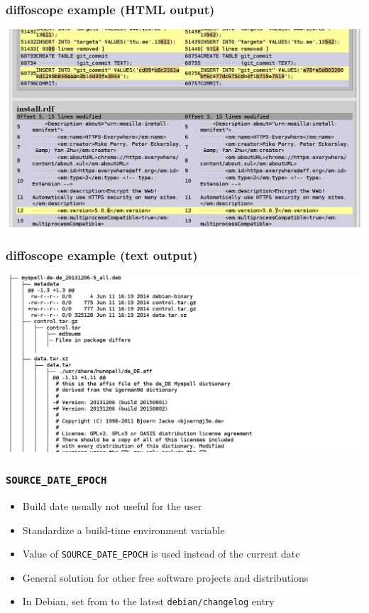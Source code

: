\documentclass[14pt]{beamer}
\begin{document}
\begin{frame}
 \frametitle{diffoscope example (HTML output)}

 \begin{center}
  \includegraphics[width=0.9\paperwidth]{images/diffoscope_example_html.png}
 \end{center}
\end{frame}

\begin{frame}
 \frametitle{diffoscope example (text output)}

 \begin{center}
  \includegraphics[width=0.9\paperwidth]{images/diffoscope_example_text.png}
 \end{center}
\end{frame}

\begin{frame}
 \frametitle{\texttt{SOURCE\_DATE\_EPOCH}}

 \begin{itemize}
  \item Build date usually not useful for the user
  \item Standardize a build-time environment variable
  \item Value of \texttt{SOURCE\_DATE\_EPOCH} is used instead of the current date
  \item General solution for other free software projects and distributions
  \item In Debian, set from to the latest \texttt{debian/changelog} entry
 \end{itemize}
\end{frame}
\end{document}
